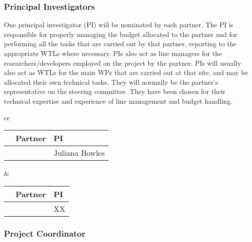\documentclass[a4paper,11pt]{article}
\begin{document}
\subsubsection*{Principal Investigators}
\vspace{-6pt}

One principal investigator (PI) will be nominated by each partner.
The PI is responsible for properly managing the budget allocated to the partner and for performing
all the tasks that are carried out by that partner, reporting to the appropriate WTLs where necessary.  PIs
also act as line managers for the researchers/developers employed on the project by the partner.
PIs will usually also act as WTLs for the main WPs that are carried out at that site, and may be allocated their own
technical tasks. They will normally be the partner's representative on the steering committee.
They have been chosen for their technical expertise and experience of line management and budget handling.


\begin{center}
\begin{tabular}{cc}
\begin{tabular}{|l|l|l|}\hline
& \textbf{Partner} & \textbf{PI} \\ \hline
\addtocounter{partic}{1}
\thepartic & \participantshort{\thepartic} &  Juliana Bowles \\\hline
\end{tabular}
\quad\quad&\quad\quad
\begin{tabular}{|l|l|l|}\hline
& \textbf{Partner} & \textbf{PI} \\ \hline
\addtocounter{partic}{1}
\thepartic & \participantshort{\thepartic} & XX \\\hline
\end{tabular}
\end{tabular}
\end{center}

\vspace{12pt}
\subsubsection*{Project Coordinator}
\vspace{-6pt}
\end{document}
